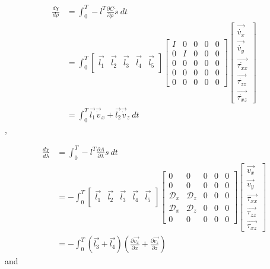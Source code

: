\documentclass[10pt]{SelfArx} %
\newcommand{\pder}[2][]{\frac{\partial#1}{\partial#2}}
\theoremstyle{definition}
\begin{document}
\begin{equation}
\begin{aligned}
\frac{d\chi}{d\rho} &= \int_0^T - l^T \pder[C]{\rho} \dot s\ dt \\
&=\int_0^T
 \begin{bmatrix}
\vec{l_1}&\vec{l_2}&\vec{l_3} &\vec{l_4} & \vec{l_5}\\
\end{bmatrix}
 \begin{bmatrix}
I & 0 & 0 & 0 & 0 \\
0  & I & 0&0&0\\
0 & 0 & 0&0&0\\
0&0&0&0&0\\
0&0&0&0&0
\end{bmatrix}
\begin{bmatrix}
\vec{\dot{v_x}}\\
\vec{\dot{v_y}}\\
\vec{\dot{\tau_{xx}}}\\
\vec{\dot{\tau_{zz}}}\\
\vec{\dot{\tau_{xz}}}
\end{bmatrix} \\
&=\int_0^T \vec{l_1}\vec{\dot{v}}_x + \vec{l_2}\vec{\dot{v}}_z \ dt 
\end{aligned}
\end{equation},

\begin{equation}
\begin{aligned}
\frac{d\chi}{d\lambda} &= \int_0^T - l^T \pder[A]{\lambda} s\ dt \\
&=-\int_0^T
 \begin{bmatrix}
\vec{l_1}&\vec{l_2}&\vec{l_3} &\vec{l_4} & \vec{l_5}\\
\end{bmatrix}
 \begin{bmatrix}
0 & 0 & 0 & 0 & 0 \\
0  & 0 & 0&0&0\\
\mathcal{D}_x & \mathcal{D}_z & 0&0&0\\
\mathcal{D}_x&\mathcal{D}_z&0&0&0\\
0&0&0&0&0
\end{bmatrix}
\begin{bmatrix}
\vec{{v_x}}\\
\vec{{v_y}}\\
\vec{{\tau_{xx}}}\\
\vec{{\tau_{zz}}}\\
\vec{{\tau_{xz}}}
\end{bmatrix} \\
&=-\int_0^T \left(\vec{l_3} + \vec{l_4}\right) \left(\pder[\vec{v_x}]{x} + \pder[\vec{v_z}]{z}\right) 
\end{aligned}
\end{equation} and
\end{document}
